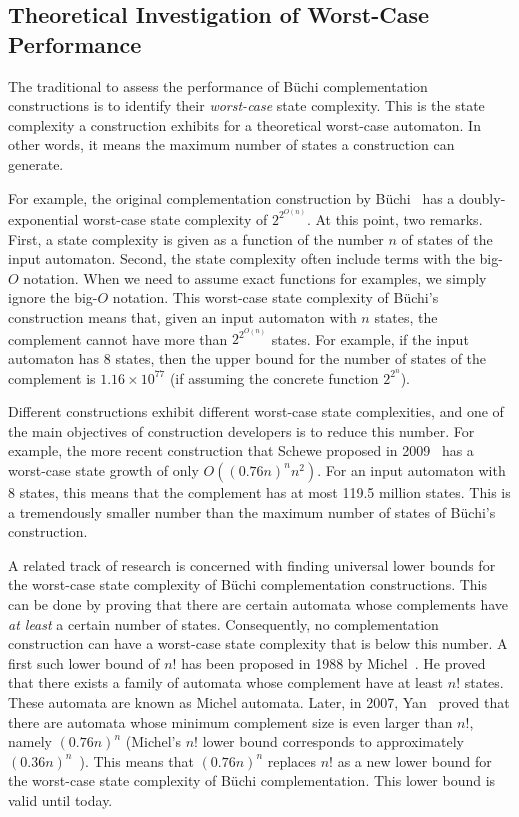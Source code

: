 \subsection{Theoretical Investigation of Worst-Case Performance}
\label{1_theoretical}
The traditional to assess the performance of Büchi complementation constructions is to identify their \textit{worst-case} state complexity. This is the state complexity a construction exhibits for a theoretical worst-case automaton. In other words, it means the maximum number of states a construction can generate.

For example, the original complementation construction by Büchi~\cite{buchi1960decision} has a doubly-exponential worst-case state complexity of $2^{2^{O\left(n\right)}}$. At this point, two remarks. First, a state complexity is given as a function of the number $n$ of states of the input automaton. Second, the state complexity often include terms with the big-$O$ notation. When we need to assume exact functions for examples, we simply ignore the big-$O$ notation. This worst-case state complexity of Büchi's construction means that, given an input automaton with $n$ states, the complement cannot have more than $2^{2^{O\left(n\right)}}$ states. For example, if the input automaton has 8 states, then the upper bound for the number of states of the complement is $1.16 \times 10^{77}$ (if assuming the concrete function $2^{2^n}$).

Different constructions exhibit different worst-case state complexities, and one of the main objectives of construction developers is to reduce this number. For example, the more recent construction that Schewe proposed in 2009~\cite{schewe2009buchi} has a worst-case state growth of only $O((0.76n)^nn^2)$. For an input automaton with 8 states, this means that the complement has at most 119.5 million states. This is a tremendously smaller number than the maximum number of states of Büchi's construction.

A related track of research is concerned with finding universal lower bounds for the worst-case state complexity of Büchi complementation constructions. This can be done by proving that there are certain automata whose complements  have \textit{at least} a certain number of states. Consequently, no complementation construction can have a worst-case state complexity that is below this number. A first such lower bound of $n!$ has been proposed in 1988 by Michel~\cite{michel1988}. He proved that there exists a family of automata whose complement have at least $n!$ states. These automata are known as Michel automata. Later, in 2007, Yan~\cite{DBLP:journals/corr/abs-0802-1226} proved that there are automata whose minimum complement size is even larger than $n!$, namely $(0.76n)^n$ (Michel's $n!$ lower bound corresponds to approximately $(0.36n)^n$~\cite{DBLP:journals/corr/abs-0802-1226}). This means that $(0.76n)^n$ replaces $n!$ as a new lower bound for the worst-case state complexity of Büchi complementation. This lower bound is valid until today.

